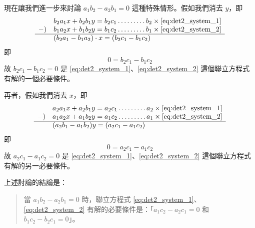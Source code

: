 現在讓我們進一步來討論 $a_1 b_2 - a_2 b_1 = 0$ 這種特殊情形。假如我們消去 $y$，即
\begin{equation*}
\begin{array}{r@{\quad}l}
  & b_2 a_1 x + b_2 b_1 y = b_2 c_1 \dots\dots\dots b_2 \times \eqref{eq:det2_system_1} \\
  -) & b_1 a_2 x + b_1 b_2 y = b_1 c_2 \dots\dots\dots b_1 \times \eqref{eq:det2_system_2} \\ \hline
  & (b_2 a_1 - b_1 a_2) \cdot x = (b_2 c_1 - b_1 c_2)
\end{array}
\end{equation*}
即
\begin{equation*}
  0 = b_2 c_1 - b_1 c_2
\end{equation*}
故 $b_2 c_1 - b_1 c_2 = 0$ 是 \eqref{eq:det2_system_1}、\eqref{eq:det2_system_2} 這個聯立方程式有解的一個必要條件。

再者，假如我們消去 $x$，即
\begin{equation*}
\begin{array}{r@{\quad}l}
  & a_2 a_1 x + a_2 b_1 y = a_2 c_1 \dots\dots\dots a_2 \times \eqref{eq:det2_system_1} \\
  -) & a_1 a_2 x + a_1 b_2 y = a_1 c_2 \dots\dots\dots a_1 \times \eqref{eq:det2_system_2} \\ \hline
  & (a_2 b_1 - a_1 b_2) y = (a_2 c_1 - a_1 c_2)
\end{array}
\end{equation*}
即
\begin{equation*}
  0 = a_2 c_1 - a_1 c_2
\end{equation*}
故 $a_2 c_1 - a_1 c_2 = 0$ 是 \eqref{eq:det2_system_1}、\eqref{eq:det2_system_2} 這個聯立方程式有解的另一必要條件。

上述討論的結論是：
\begin{quote}
當 $a_1 b_2 - a_2 b_1 = 0$ 時，聯立方程式 \eqref{eq:det2_system_1}、\eqref{eq:det2_system_2} 有解的必要條件是：「$a_1 c_2 - a_2 c_1 = 0$ 和 $b_1 c_2 - b_2 c_1 = 0$」。
\end{quote}

